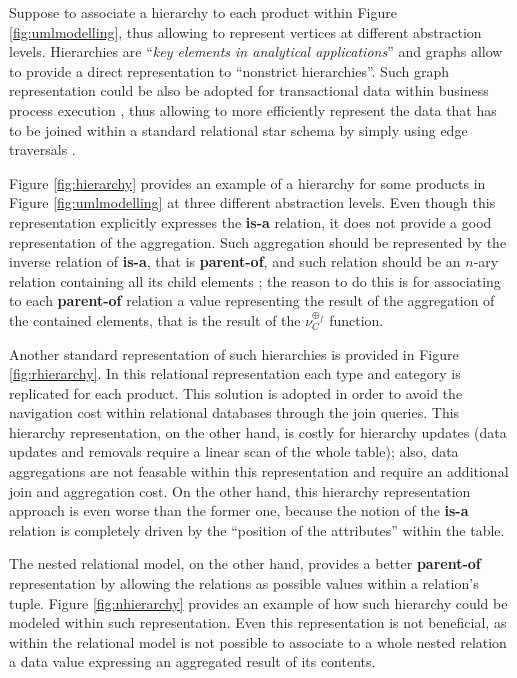 \begin{example}[label=ex:inaggr]
Suppose to associate a hierarchy to each product within Figure \vref{fig:umlmodelling}, thus allowing to represent vertices at different abstraction levels. Hierarchies are ``\textit{key elements in analytical applications}'' \cite{dwbook} and graphs  allow to provide a direct representation to ``nonstrict hierarchies''. Such graph representation could be also be adopted for transactional data within business process execution \cite{PterMicBergami}, thus allowing to more efficiently represent   the data that has to be joined within a standard relational star schema by simply using edge traversals  \cite{Vasilyeva13,preSQLGraph,SQLGraph}.

Figure \ref{fig:hierarchy} provides an example of a hierarchy for some products in Figure \vref{fig:umlmodelling} at three different abstraction levels. Even though this representation explicitly expresses the \textbf{is-a} relation, it does not provide a good representation of the aggregation. Such aggregation should be represented by the inverse relation of \textbf{is-a}, that is \textbf{parent-of}, and such relation should be an $n$-ary relation containing all its child elements \cite{Johnson2011}; the reason to do this is for associating to each \textbf{parent-of} relation a value representing the result of the aggregation of the contained elements, that is the result of the $\nu_C^{\oplus_f}$\index{$\nu$} function.

Another standard representation of such hierarchies is provided in Figure \ref{fig:rhierarchy}. In this relational representation  each type and category is replicated for each product. This solution is adopted in order to avoid the navigation cost within relational databases through the join queries. This hierarchy representation, on the other hand, is costly for  hierarchy updates (data updates and removals require a linear scan of the whole table); also, data aggregations are not feasable within this representation and require an additional join and aggregation cost. On the other hand, this hierarchy representation approach is even worse than the former one, because the notion of the \textbf{is-a} relation is completely driven by the ``position of the attributes'' within the table.

The nested relational model, on the other hand, provides a better \textbf{parent-of} representation by allowing the relations as possible values within a relation's tuple. Figure \ref{fig:nhierarchy} provides an example of how such hierarchy could be modeled within such representation. Even this representation is not beneficial, as within the relational model is not possible to associate to a whole nested relation a data value expressing an aggregated result of its contents.


\end{example}
